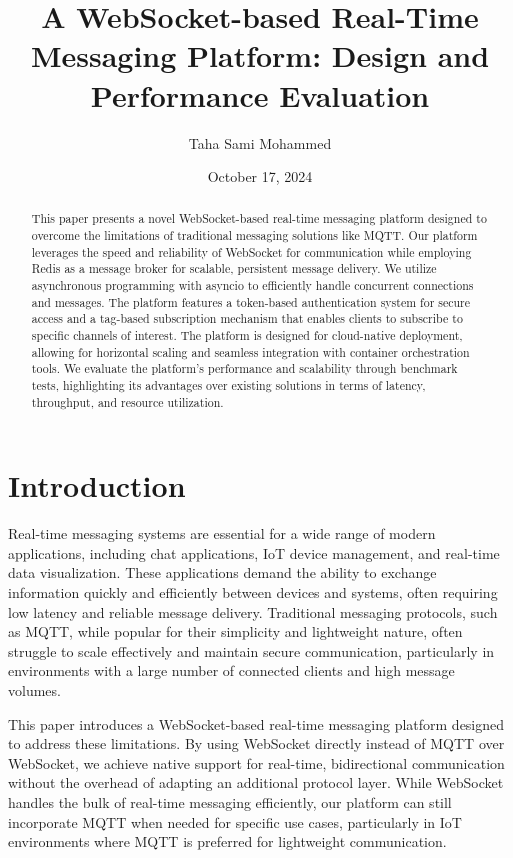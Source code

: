 \documentclass[a4paper, 11pt]{article}
\title{A WebSocket-based Real-Time Messaging Platform: Design and Performance Evaluation}
\author{Taha Sami Mohammed}
\date{October 17, 2024}
\begin{document}
\maketitle

\begin{abstract}
This paper presents a novel WebSocket-based real-time messaging platform designed to overcome the limitations of traditional messaging solutions like MQTT. Our platform leverages the speed and reliability of WebSocket for communication while employing Redis as a message broker for scalable, persistent message delivery. We utilize asynchronous programming with asyncio to efficiently handle concurrent connections and messages. The platform features a token-based authentication system for secure access and a tag-based subscription mechanism that enables clients to subscribe to specific channels of interest. The platform is designed for cloud-native deployment, allowing for horizontal scaling and seamless integration with container orchestration tools. We evaluate the platform's performance and scalability through benchmark tests, highlighting its advantages over existing solutions in terms of latency, throughput, and resource utilization.
\end{abstract}

\section{Introduction}
Real-time messaging systems are essential for a wide range of modern applications, including chat applications, IoT device management, and real-time data visualization. These applications demand the ability to exchange information quickly and efficiently between devices and systems, often requiring low latency and reliable message delivery. Traditional messaging protocols, such as MQTT, while popular for their simplicity and lightweight nature, often struggle to scale effectively and maintain secure communication, particularly in environments with a large number of connected clients and high message volumes.

This paper introduces a WebSocket-based real-time messaging platform designed to address these limitations. By using WebSocket directly instead of MQTT over WebSocket, we achieve native support for real-time, bidirectional communication without the overhead of adapting an additional protocol layer. While WebSocket handles the bulk of real-time messaging efficiently, our platform can still incorporate MQTT when needed for specific use cases, particularly in IoT environments where MQTT is preferred for lightweight communication.
\end{document}
